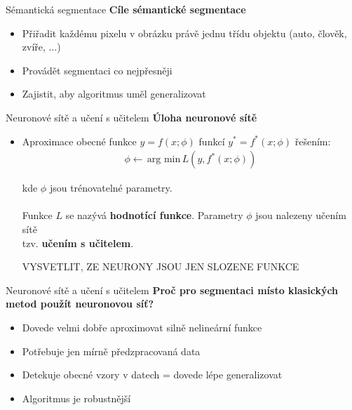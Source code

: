 \documentclass[aspectratio=1610]{beamer}
\begin{document}
\begin{frame}{Sémantická segmentace}
	\textbf{Cíle sémantické segmentace}
	\begin{itemize}
	\item Přiřadit každému pixelu v obrázku právě jednu třídu objektu (auto, člověk, zvíře, ...)
	\item Provádět segmentaci co nejpřesněji
	\item Zajistit, aby algoritmus uměl generalizovat
	\end{itemize}
	\vspace{5mm}		
	\begin{center}	
	\end{center}
\end{frame}
\begin{frame}{Neuronové sítě a učení s učitelem}
	\textbf{Úloha neuronové sítě}
	\begin{itemize}
		\item Aproximace obecné funkce $y=f(x;\phi)$ funkcí $ y^* = f^*(x;\phi)	$ řešením:					
		\begin{gather}
		\phi \leftarrow \, \text{arg min} \, L(y, f^*(x;\phi))	
		\end{gather} 
		 		
		\noindent kde $ \phi $ jsou trénovatelné parametry. \\~\\
		Funkce $ L $ se nazývá \textbf{hodnotící funkce}. Parametry $ \phi $ jsou nalezeny učením sítě \\ tzv. \textbf{učením s učitelem}.
		
		VYSVETLIT, ZE NEURONY JSOU JEN SLOZENE FUNKCE
	\end{itemize}
\end{frame}
\begin{frame}{Neuronové sítě a učení s učitelem}
\textbf{Proč pro segmentaci místo klasických metod použít neuronovou síť?}
\begin{itemize}
	\item Dovede velmi dobře aproximovat silně nelineární funkce
	\item Potřebuje jen mírně předzpracovaná data
	\item Detekuje obecné vzory v datech = dovede lépe generalizovat
	\item Algoritmus je robustnější
	
\end{itemize}
\end{frame}
\end{document}
